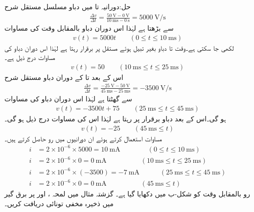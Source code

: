 حل:دورانیہ  تا  میں دباو مسلسل مستقل شرح
\begin{align*}
\frac{\Delta v}{\Delta t}=\frac{\SI{50}{\volt}-\SI{0}{\volt}}{\SI{10}{\milli\second}-\SI{0}{\second}}=\SI{5000}{\volt\per\second}
\end{align*}
 سے بڑھتا ہے لہٰذا اس دوران دباو بالمقابل وقت کی مساوات 
\begin{align*}
v(t)=5000 t \quad \quad (0 \le t \le \SI{10}{\milli\second})
\end{align*}
لکھی جا سکتی ہے۔وقت  تا  دباو بغیر تبیل ہوئے مستقل  پر برقرار رہتا ہے لہٰذا اس دوران دباو کی مساوات درج ذیل ہے۔
\begin{align*}
v(t)=50 \quad \quad (\SI{10}{\milli\second} \le t \le \SI{25}{\milli\second})
\end{align*}
اس کے بعد  تا  کے دوران دباو مستقل شرح
\begin{align*}
\frac{\Delta v}{\Delta t}=\frac{\SI{-25}{\volt}-\SI{50}{\volt}}{\SI{45}{\milli\second}-\SI{25}{\milli\second}}=\SI{-3500}{\volt \per \second}
\end{align*}
سے گھٹتا ہے لہٰذا اس دوران دباو کی مساوات
\begin{align*}
v(t)=-3500 t +75 \quad \quad (\SI{25}{\milli\second} \le t \le \SI{45}{\milli\second})
\end{align*}
ہو گی۔اس کے بعد دباو برقرار  پر رہتا ہے لہٰذا اس کی مساوات درج ذیل ہو گی۔
\begin{align*}
v(t)=-25 \quad \quad (\SI{45}{\milli\second} \le t)
\end{align*}
مساوات  استعمال کرتے ہوئے ان دورانیوں میں رو حاصل کرتے ہیں۔
\begin{align*}
i&=2\times 10^{-6} \times 5000=\SI{10}{\milli\ampere} \quad \quad \quad \quad  (0 \le t \le \SI{10}{\milli\second})\\
i&=2\times 10^{-6} \times 0=\SI{0}{\milli\ampere} \quad \quad \quad \quad \quad   (\SI{10}{\milli\second} \le t \le \SI{25}{\milli\second})\\
i&=2\times 10^{-6} \times (-3500)=\SI{-7}{\milli\ampere} \quad \quad   \quad  (\SI{25}{\milli\second} \le t \le \SI{45}{\milli\second})\\
i&=2\times 10^{-6} \times 0=\SI{0}{\milli\ampere} \quad \quad \quad \quad   \quad(\SI{45}{\milli\second} \le t)
\end{align*}
رو بالمقابل وقت کو شکل-ب میں دکھایا گیا ہے۔
گزشتہ مثال میں لمحہ ،  اور  پر برق گیر میں ذخیرہ مخفی تونائی دریافت کریں۔

